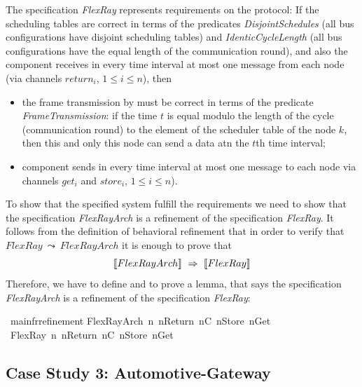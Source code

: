 %
The  specification \emph{FlexRay}  represents requirements on the protocol: 
If the scheduling tables are correct in terms of the predicates 
\emph{Disjoint\-Schedules} (all bus configurations have disjoint scheduling tables) 
and \emph{Identic\-Cycle\-Length} (all bus configurations have the equal length of the communication round), and 
also the \fr component receives in every time interval at most one message from each node 
(via channels $return_i$, $1 \le i \le n$), then
\begin{itemize}
  \item 
  the frame transmission by \fr must be correct in terms of the predicate 
  \emph{FrameTransmission}: if the time $t$ is equal modulo the length of the cycle (\fr communication round) 
to the element of the scheduler table of the node $k$, then this and only this node 
can send a data atn the $t$th time interval;
  \item 
  \fr component sends in every time interval at most one message to each node 
 via channels $get_i$ and $store_i$, $1 \le i \le n$).
\end{itemize}
%
To show that the specified system fulfill the requirements we need to show that
the specification \emph{FlexRayArch} is a refinement of the specification \emph{FlexRay}. 
It follows from the definition of behavioral refinement that in order to verify that 
$
FlexRay~ \leadsto ~ FlexRayArch
$
%
it is enough to prove that
$$
\tlangle FlexRayArch\trangle~ \Rightarrow ~\tlangle FlexRay\trangle
$$
% 
Therefore, we have to define and to prove a lemma, that says the specification 
\emph{FlexRayArch} is a refinement of the specification \emph{FlexRay}:
\\

\begin{isabellebody}%
\isamarkupfalse%
\ main{\isacharunderscore}fr{\isacharunderscore}refinement{\isacharcolon}\isanewline
FlexRayArch\ n\ nReturn\ nC\ nStore\ nGet\ %
{\isasymLongrightarrow}\ FlexRay\ n\ nReturn\ nC\ nStore\ nGet\isanewline
\end{isabellebody}%






\subsection{Case Study 3: Automotive-Gateway}


